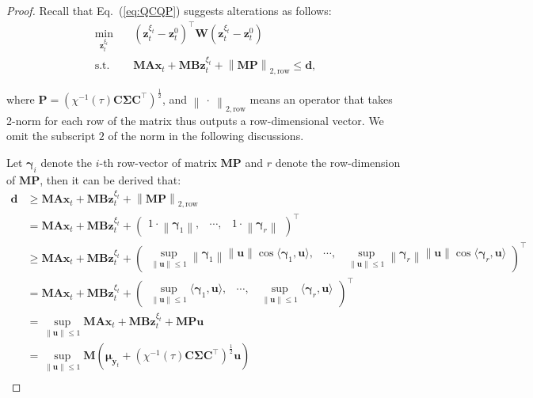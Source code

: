 \documentclass{article}
\theoremstyle{plain}
\theoremstyle{definition}
\theoremstyle{remark}
\def \Eq {Eq.}
\def \x {\mathbf{x}}
\def \P {\mathbf{P}}
\def \M {\mathbf{M}}
\def \A {\mathbf{A}}
\def \B {\mathbf{B}}
\def \P {\mathbf{P}}
\def \C {\mathbf{C}}
\def \W {\mathbf{W}}
\def \y {\mathbf{y}}
\def \z {\mathbf{z}}
\def \d {\mathbf{d}}
\def \u {\mathbf{u}}
\begin{document}
\begin{proof}
Recall that \Eq~(\ref{eq:QCQP}) suggests alterations as follows:
\vskip -0.15in
\begin{equation*}
  \begin{aligned}
    \mathop{\min}_{\z^{\xi_t}_t}&\quad \left(\z^{\xi_t}_t - \z^0_t\right)^\top \W \left(\z^{\xi_t}_t - \z^0_t\right)\\
    \text{s.t.}&\quad \M\A\x_t + \M\B\z^{\xi_t}_t + \left\|\M\P\right\|_{2,\text{row}} \leq \d, 
  \end{aligned}
\end{equation*}
\vskip -0.15in

where $\P = \left(\chi^{-1}(\tau)\C\bm{\Sigma}\C^\top\right)^\frac{1}{2}$, and $\left\|\ \cdot\ \right\|_{2,\text{row}}$ means an operator that takes 2-norm for each row of the matrix thus outputs a row-dimensional vector. We omit the subscript $2$ of the norm in the following discussions. 

Let $\bm{\gamma}_i$ denote the $i$-th row-vector of matrix $\M\P$ and $r$ denote the row-dimension of $\M\P$, then it can be derived that: 
\[
\begin{aligned}
  \d&\geq\M\A\x_t + \M\B\z^{\xi_t}_t + \left\|\M\P\right\|_{2,\text{row}} \\
  &= \M\A\x_t + \M\B\z^{\xi_t}_t + \begin{pmatrix}
    1 \cdot\left\|\bm{\gamma}_1\right\|, & \cdots, & 1 \cdot\left\|\bm{\gamma}_r\right\|
  \end{pmatrix}^\top
  \\
  &\geq \M\A\x_t + \M\B\z^{\xi_t}_t +   \begin{pmatrix}
    \mathop{\sup}\limits_{\|\u\| \leq 1}  \left\|\bm{\gamma}_1\right\|\left\|\u\right\| \cos\langle\bm{\gamma}_1, \u\rangle , & \cdots, &  \mathop{\sup}\limits_{\|\u\| \leq 1}\left\|\bm{\gamma}_r\right\|\left\|\u\right\|\cos\langle\bm{\gamma}_r, \u\rangle
  \end{pmatrix}^\top
  \\
  &= \M\A\x_t + \M\B\z^{\xi_t}_t +   \begin{pmatrix}
    \mathop{\sup}\limits_{\|\u\| \leq 1}  \langle\bm{\gamma}_1, \u\rangle , & \cdots, & \mathop{\sup}\limits_{\|\u\| \leq 1} \langle\bm{\gamma}_r, \u\rangle
  \end{pmatrix}^\top
  \\
  &= \mathop{\sup}\limits_{\|\u\| \leq 1} \M\A\x_t + \M\B\z^{\xi_t}_t + \M\P\u\\
  &= \mathop{\sup}\limits_{\|\u\| \leq 1} \M\left(\bm{\mu}_{\y_t} + \left(\chi^{-1}(\tau)\C\bm{\Sigma}\C^\top\right)^\frac{1}{2}\u\right)\\
\end{aligned}
\]


\end{proof}
\end{document}
